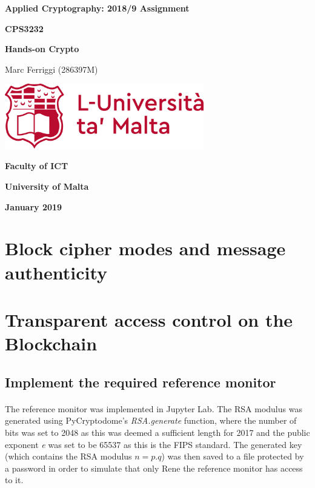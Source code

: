 \documentclass[12pt, twoside]{report}
\begin{document}
	\begin{titlepage}
		\centering
		{\LARGE\bfseries Applied Cryptography: 2018/9 Assignment\par}
		\vspace{.5cm}
		
		{\Large \textbf{CPS3232} \par}
		\vspace{.5cm}
		
		{\large \textbf{Hands-on Crypto}\par}
		\vspace{0.5cm}
		
		{\large Marc Ferriggi (286397M)\par}
		\vfill
		
		\includegraphics[width=0.65\textwidth]{UoMLogo}\par
		\vfill
		
		{\large\bfseries Faculty of ICT \par}
		{\large\bfseries University of Malta \par}
		{\large\bfseries January 2019 \par}
	\end{titlepage}
	
	\tableofcontents
	\vfill
	\cleardoublepage
	
	\section{Block cipher modes and message authenticity}
	\pagebreak
	
	\section{Transparent access control on the Blockchain}
	\subsection{Implement the required reference monitor}
	\paragraph{ }The reference monitor was implemented in Jupyter Lab. The RSA modulus was generated using PyCryptodome's \textit{RSA.generate} function, where the number of bits was set to 2048 as this was deemed a sufficient length for 2017 and the public exponent \textit{e} was set to be 65537 as this is the FIPS standard. The generated key (which contains the RSA modulus $n=p.q$) was then saved to a file protected by a password in order to simulate that only Rene the reference monitor has access to it.
	
\end{document}

